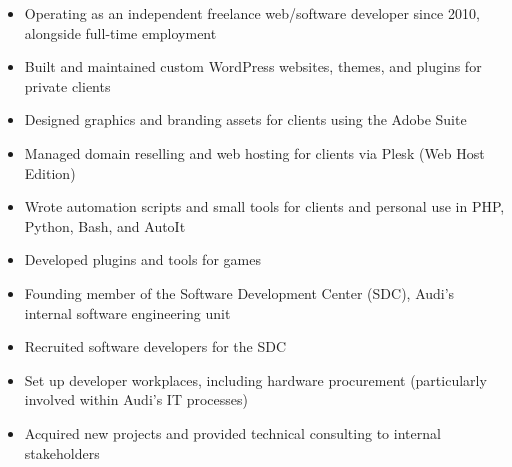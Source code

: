 \documentclass[]{project-reference}
\begin{document}
\projectsep



\begin{itemize}
  \item Operating as an independent freelance web/software developer since 2010, alongside full-time employment
  \item Built and maintained custom WordPress websites, themes, and plugins for private clients
  \item Designed graphics and branding assets for clients using the Adobe Suite
  \item Managed domain reselling and web hosting for clients via Plesk (Web Host Edition)
  \item Wrote automation scripts and small tools for clients and personal use in PHP, Python, Bash, and AutoIt
  \item Developed plugins and tools for games
\end{itemize}

\projectsep



\begin{itemize}
  \item Founding member of the Software Development Center (SDC), Audi's internal software engineering unit
  \item Recruited software developers for the SDC
  \item Set up developer workplaces, including hardware procurement (particularly involved within Audi's IT processes)
  \item Acquired new projects and provided technical consulting to internal stakeholders
\end{itemize}
\end{document}

